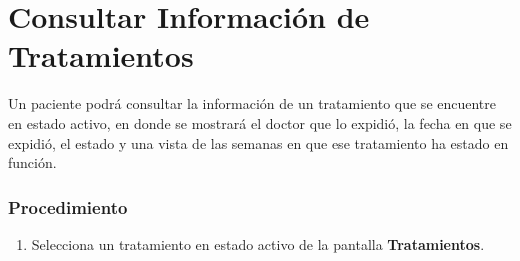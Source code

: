 \section{Consultar Información de Tratamientos}

Un paciente podrá consultar la información de un tratamiento que se encuentre en estado activo, en donde se mostrará el doctor que lo expidió, la fecha en que se expidió, el estado y una vista de las semanas en que ese tratamiento ha estado en función.

\subsubsection{Procedimiento}
\begin{enumerate}
	
	\item Selecciona un tratamiento en estado activo de la pantalla \textbf{Tratamientos}.


\end{enumerate}
